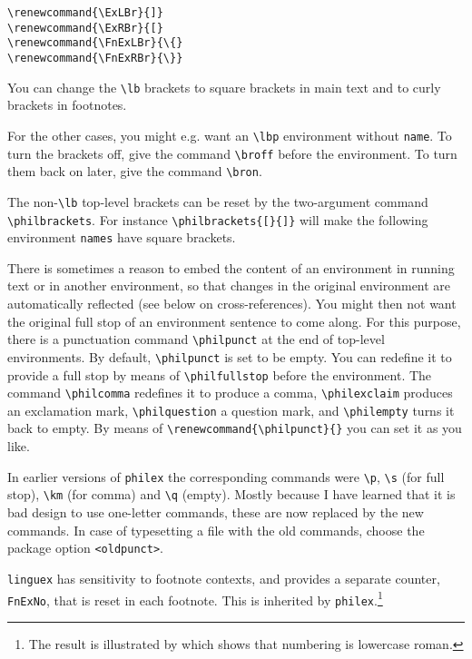 \documentclass[11pt]{article}
\newcommand{\note}{\footnote}
\begin{document}
\begin{verbatim}
\renewcommand{\ExLBr}{]}
\renewcommand{\ExRBr}{[}
\renewcommand{\FnExLBr}{\{}
\renewcommand{\FnExRBr}{\}}
\end{verbatim}%
% 
You can change the \verb+\lb+ brackets to square brackets in main text and to curly brackets in footnotes.


For the other cases, you might e.g. want an \verb+\lbp+ environment without \verb+name+. To turn the brackets off, give the command \verb+\broff+ before the environment. To turn them back on later, give the command \verb+\bron+.

The non-\verb+\lb+ top-level brackets can be reset by the two-argument command \verb+\philbrackets+. For instance \verb+\philbrackets{[}{]}+ will make the following environment \verb+names+ have square brackets.

There is sometimes a reason  to embed the content of an environment in running text or in another environment, so that changes in the original environment are automatically reflected (see below on cross-references). You might then not want the original full stop of an environment sentence to come along. For this purpose, there is a punctuation command \verb+\philpunct+ at the end of top-level environments. By default, \verb+\philpunct+ is set to be empty. You can redefine it to provide a full stop by means of \verb+\philfullstop+ before the environment. The command \verb+\philcomma+ redefines it to produce a comma, \verb+\philexclaim+ produces an exclamation mark, \verb+\philquestion+ a question mark, and \verb+\philempty+ turns it back to empty. By means of \verb+\renewcommand{\philpunct}{}+ you can set it as you like.

In earlier versions of \verb+philex+ the corresponding commands were \verb+\p+,  \verb+\s+ (for full stop), \verb+\km+ (for comma) and \verb+\q+ (empty). Mostly because I have learned that it is bad design to use one-letter commands, these are now replaced by the new commands. In case of typesetting a file with the old commands, choose the package option \verb+<oldpunct>+.

\verb+linguex+ has  sensitivity to footnote contexts, and provides a separate counter, \verb+FnExNo+, that is reset in each footnote. This is inherited by \verb+philex+.\note
	{The result is illustrated by 
		which shows that numbering is lowercase roman.}
\end{document}
